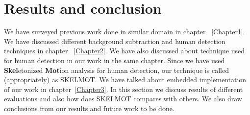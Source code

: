 \chapter{Results and conclusion} %
\label{Chapter4}
\indent We have surveyed previous work done in similar domain in chapter
~\ref{Chapter1}. We have discussed different background subtraction and
human detection techniques in chapter ~\ref{Chapter2}. We have also
discussed about technique used for human detection in our work in the
same chapter. Since we have used \textbf{Skel}etonized \textbf{Mot}ion
analysis for human detection, our technique is called (appropriately) as
SKELMOT. We have talked about embedded implementation of our work in
chapter~\ref{Chapter3}. In this section we discuss results of different
evaluations and also how does SKELMOT compares with others. We also draw
conclusions from our results and future work to be done.
